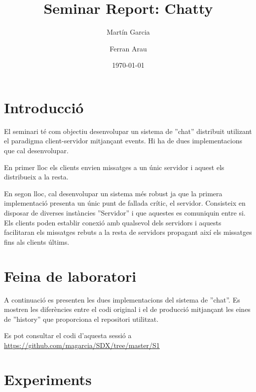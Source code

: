 \documentclass[a4paper, 11pt]{article}
\title{Seminar Report: Chatty}
\author{Martín Garcia \and Ferran Arau}
\date{\today{}}
\begin{document}
\maketitle

\section{Introducció}


El seminari té com objectiu desenvolupar un sistema de ''chat'' distribuit
utilizant el paradigma client-servidor mitjançant events. Hi ha de dues
implementacions que cal desenvolupar.

En primer lloc els clients envien missatges a un únic servidor i aquest els
distribueix a la resta. 

En segon lloc, cal desenvolupar un sistema més robust ja que la primera
implementació presenta un únic punt de fallada crític, el servidor. Consisteix
en disposar de diverses instàncies ''Servidor'' i que aquestes es comuniquin
entre si. Els clients poden establir conexió amb qualsevol dels servidors i
aquests facilitaran els missatges rebuts a la resta de servidors propagant així
els missatges fins als clients últims.

\section{Feina de laboratori}


A continuació es presenten les dues implementacions del sistema de ''chat''. Es
mostren les diferències entre el codi original i el de producció mitjançant les
eines de ''history'' que proporciona el repositori utilitzat. 

Es pot consultar el codi d'aquesta sessió a
\url{https://github.com/magarcia/SDX/tree/master/S1}


\section{Experiments}

\end{document}
